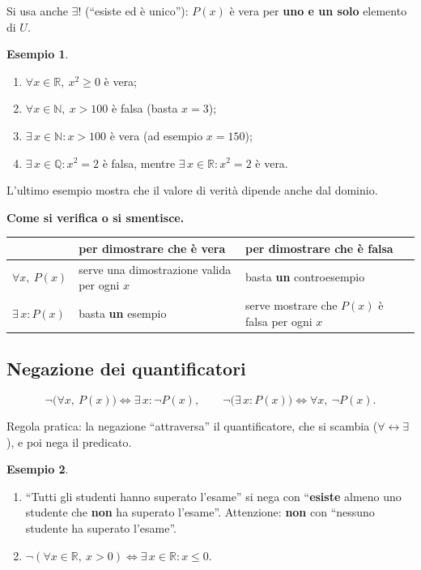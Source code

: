 \documentclass[11pt,a4paper]{article}
\theoremstyle{definition}
\newtheorem*{esempio}{Esempio}
\begin{document}
Si usa anche $\exists!$ (``esiste ed è unico''): $P(x)$ è vera per
\textbf{uno e un solo} elemento di $U$.

\begin{esempio}\mbox{}
\begin{enumerate}
    \item $\forall x \in \mathbb{R},\ x^2 \geq 0$ \quad è vera;
    \item $\forall x \in \mathbb{N},\ x > 100$ \quad è falsa (basta
          $x = 3$);
    \item $\exists\, x \in \mathbb{N} : x > 100$ \quad è vera (ad esempio
          $x = 150$);
    \item $\exists\, x \in \mathbb{Q} : x^2 = 2$ \quad è falsa, mentre
          $\exists\, x \in \mathbb{R} : x^2 = 2$ è vera.
\end{enumerate}
\end{esempio}

L'ultimo esempio mostra che il valore di verità dipende anche dal dominio.

\textbf{Come si verifica o si smentisce.}
\begin{center}
\begin{tabular}{l|p{5.2cm}|p{5.2cm}}
 & per dimostrare che è vera & per dimostrare che è falsa \\ \hline
$\forall x,\ P(x)$ & serve una dimostrazione valida per ogni $x$ &
basta \textbf{un} controesempio \\ \hline
$\exists\, x : P(x)$ & basta \textbf{un} esempio &
serve mostrare che $P(x)$ è falsa per ogni $x$
\end{tabular}
\end{center}

\subsection{Negazione dei quantificatori}

\begin{teorema}
\[
\neg\big(\forall x,\ P(x)\big) \iff \exists\, x : \neg P(x), \qquad
\neg\big(\exists\, x : P(x)\big) \iff \forall x,\ \neg P(x).
\]
\end{teorema}

Regola pratica: la negazione ``attraversa'' il quantificatore, che si
scambia ($\forall \leftrightarrow \exists$), e poi nega il predicato.

\begin{esempio}\mbox{}
\begin{enumerate}
    \item ``Tutti gli studenti hanno superato l'esame'' si nega con
          ``\textbf{esiste} almeno uno studente che \textbf{non} ha superato
          l'esame''. Attenzione: \textbf{non} con ``nessuno studente ha
          superato l'esame''.
    \item $\neg(\forall x \in \mathbb{R},\ x > 0) \iff
          \exists\, x \in \mathbb{R} : x \leq 0$.
\end{enumerate}
\end{esempio}
\end{document}
